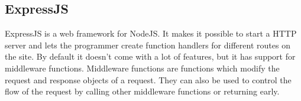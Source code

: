 \subsection{ExpressJS}
ExpressJS is a web framework for NodeJS. It makes it possible to start a HTTP server and lets the programmer create function handlers for different routes on the site. By default it doesn't come with a lot of features, but it has support for middleware functions. Middleware functions are functions which modify the request and response objects of a request. They can also be used to control the flow of the request by calling other middleware functions or returning early.